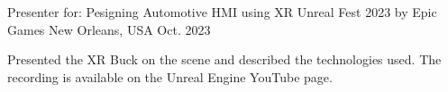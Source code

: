 

\begin{cventries}

  \cventry
    {Presenter for: Pesigning Automotive HMI using XR} %
    {Unreal Fest 2023 by Epic Games} %
    {New Orleans, USA} %
    {Oct. 2023} %
    {
      \begin{cvitems} %
        Presented the XR Buck on the scene and described the technologies used. The recording is available on the Unreal Engine YouTube page.
      \end{cvitems}
    }

\end{cventries}

